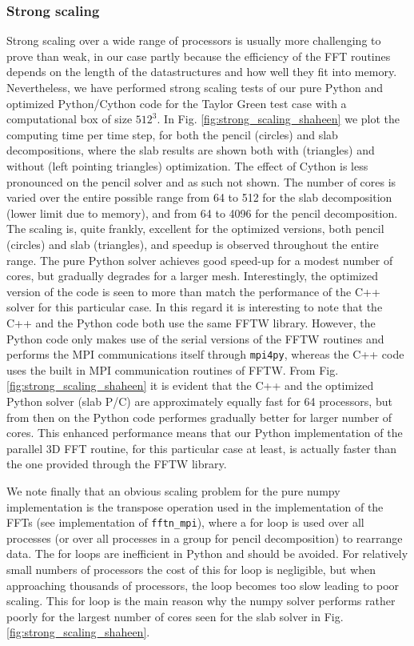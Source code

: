 \documentclass[11pt, oneside]{article}
\newcommand{\inpyth}{\lstinline[style=pythonstyle, basicstyle=\ttfamily]} %[]%
\begin{document}
\subsubsection{Strong scaling}
\label{sec:strong_scaling}
Strong scaling over a wide range of processors is usually more challenging 
to prove than weak, in our case partly because the efficiency of the FFT routines 
depends on the length of the datastructures and how well they fit into 
memory. Nevertheless, we have performed strong scaling tests of our pure Python and optimized 
Python/Cython code for the Taylor Green test case with a computational box of size $512^3$. In Fig. 
\ref{fig:strong_scaling_shaheen} we plot the computing time per time step, for both the pencil (circles) and slab decompositions, where the slab results are shown both with (triangles) and without (left pointing triangles) optimization. The effect of Cython is less pronounced on the pencil solver and as such not shown. The number of 
cores is varied over the entire possible range from 64 to 512 for the slab 
decomposition (lower limit due to memory), and from 64 to 4096 for the 
pencil decomposition. The scaling is, quite frankly, excellent for the optimized versions, both pencil (circles) and slab (triangles), and speedup is observed 
throughout the entire range. The pure Python solver achieves good speed-up 
for a modest number of cores, but gradually degrades for a larger mesh. Interestingly, the optimized version of the code is seen 
to more than match the performance of the C++ solver for this particular 
case. In this regard it is interesting to note that the C++ and the Python code both use the same FFTW library. However, the Python code only makes use of the serial versions of the FFTW 
routines and performs the MPI communications itself through 
\inpyth{mpi4py}, whereas the C++ code uses the built in MPI communication routines of FFTW. From Fig. \ref{fig:strong_scaling_shaheen} it is evident 
that the C++ and the optimized Python solver (slab P/C) are approximately 
equally fast for 64 processors, but from then on the Python code performes 
gradually better for larger number of cores. This enhanced performance 
means that our Python implementation of the parallel 3D FFT routine, for this 
particular case at least, is actually faster than the one provided through the FFTW library.

We note finally that an obvious scaling problem for the pure numpy implementation is the transpose operation used in the implementation of the FFTs 
(see implementation of \inpyth{fftn_mpi}), where a for loop is used over all processes (or over all 
processes in a group for pencil decomposition) to rearrange data. The for loops are inefficient in Python 
and should be avoided. For relatively small numbers of processors the cost of this for loop is negligible, 
but when approaching thousands of processors, the loop becomes too slow leading to poor scaling. This for loop is the main reason why the numpy solver performs rather poorly for the largest number of cores seen for the slab solver in Fig. \ref{fig:strong_scaling_shaheen}. 
\end{document}

